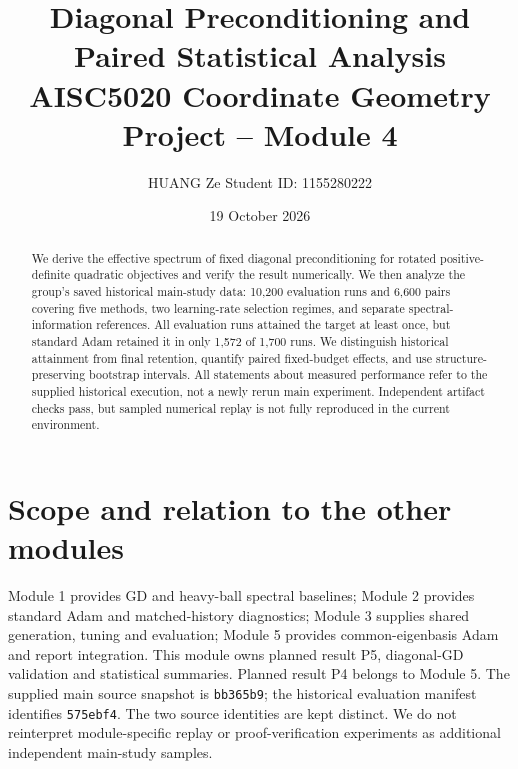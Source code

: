 \documentclass[10pt,a4paper]{article}
\title{Diagonal Preconditioning and Paired Statistical Analysis\\
\large AISC5020 Coordinate Geometry Project -- Module 4}
\author{HUANG Ze \quad Student ID: 1155280222}
\date{19 October 2026}
\begin{document}
\maketitle
\begin{abstract}
We derive the effective spectrum of fixed diagonal preconditioning for rotated
positive-definite quadratic objectives and verify the result numerically.
We then analyze the group's saved historical main-study data: 10,200 evaluation
runs and 6,600 pairs covering five methods, two learning-rate selection regimes,
and separate spectral-information references. All evaluation runs attained the
target at least once, but standard Adam retained it in only 1,572 of 1,700 runs.
We distinguish historical attainment from final retention, quantify paired
fixed-budget effects, and use structure-preserving bootstrap intervals.
All statements about measured performance refer to the supplied historical
execution, not a newly rerun main experiment. Independent artifact checks pass,
but sampled numerical replay is not fully reproduced in the current environment.
\end{abstract}

\section{Scope and relation to the other modules}
Module 1 provides GD and heavy-ball spectral baselines; Module 2 provides
standard Adam and matched-history diagnostics; Module 3 supplies shared
generation, tuning and evaluation; Module 5 provides common-eigenbasis Adam
and report integration. This module owns planned result P5, diagonal-GD
validation and statistical summaries. Planned result P4 belongs to Module 5.
The supplied main source snapshot is \texttt{bb365b9}; the historical evaluation
manifest identifies \texttt{575ebf4}. The two source identities are kept distinct.
We do not reinterpret module-specific replay or proof-verification experiments
as additional independent main-study samples.
\end{document}
